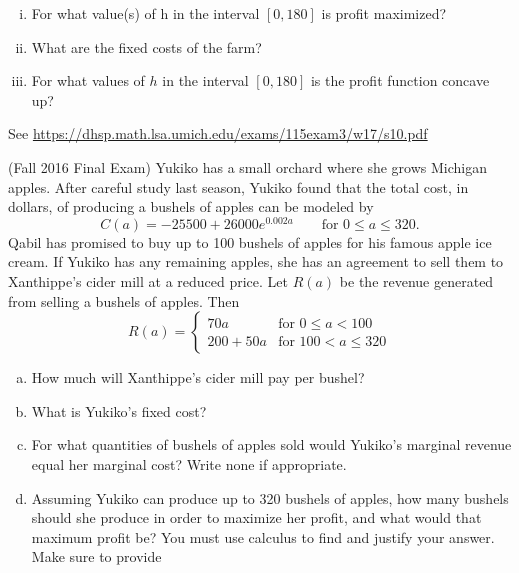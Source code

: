 \documentclass[11pt]{exam}
\begin{document}
\begin{questions}
\begin{enumerate}[(i)]
		\item For what value(s) of h in the interval $[0, 180]$ is profit maximized?
		\item What are the fixed costs of the farm?
		\item For what values of $h$ in the interval $[0, 180]$ is the profit function concave up?
	\end{enumerate}
        \begin{solution}
         See \href{https://dhsp.math.lsa.umich.edu/exams/115exam3/w17/s10.pdf}{https://dhsp.math.lsa.umich.edu/exams/115exam3/w17/s10.pdf}
        \end{solution}

      \question (Fall 2016 Final Exam) %
        Yukiko has a small orchard where she grows Michigan apples. After careful study last season, Yukiko found that the total cost, in dollars, of producing a bushels of apples can
be modeled by
$$C(a) = -25500+26000e^{0.002a} \qquad \textrm{for } 0 \leqslant a \leqslant 320.$$
Qabil has promised to buy up to 100 bushels of apples for his famous apple ice cream. If Yukiko has any remaining apples, she has an agreement to sell them to Xanthippe’s cider mill at a reduced price. Let $R(a)$ be the revenue generated from selling a bushels of apples. Then
$$R(a)=\left\lbrace \begin{array}{ll} 70a & \textrm{for } 0 \leqslant a < 100 \\ 200+50a & \textrm{for } 100 < a \leqslant 320 \end{array}\right.$$
\begin{enumerate}[(a)]
	\item How much will Xanthippe's cider mill pay per bushel?
	\item What is Yukiko's fixed cost?
	\item For what quantities of bushels of apples sold would Yukiko's marginal revenue equal her marginal cost? Write none if appropriate.
	\item Assuming Yukiko can produce up to 320 bushels of apples, how many bushels should she produce in order to maximize her profit, and what would that maximum profit be? You must use calculus to find and justify your answer. Make sure to provide

\end{enumerate}
\end{questions}
\end{document}
